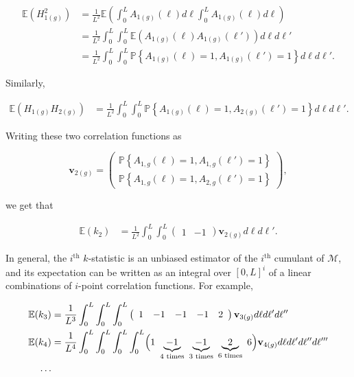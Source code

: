 \documentclass[11pt]{amsart}
\begin{document}
\begin{align*}
	\mathbb{E}(H_{1(g)}^2)
		&=\frac{1}{L^2}\mathbb{E}\left(\int_0^L A_{1(g)}(\ell) d\ell \int_0^L A_{1(g)}(\ell) d\ell\right)\\
		&=\frac{1}{L^2}\int_0^L\int_0^L\mathbb{E}\left(A_{1(g)}(\ell) A_{1(g)}(\ell')\right) d\ell d\ell'\\
		&=\frac{1}{L^2}\int_0^L\int_0^L\mathbb{P}\left\{A_{1(g)}(\ell)=1, A_{1(g)}(\ell')=1\right\} d\ell d\ell'.
\end{align*}

Similarly,

\begin{align*}
	\mathbb{E}(H_{1(g)}H_{2(g)})
		&=\frac{1}{L^2}\int_0^L\int_0^L\mathbb{P}\left\{ A_{1(g)}(\ell)=1, A_{2(g)}(\ell')=1\right\} d\ell d\ell'.
\end{align*}

Writing these two correlation functions as 

$$\mathbf{v}_{2(g)}=\left( \begin{array}{r}
			\mathbb{P}\left\{A_{1,g}(\ell)=1, A_{1,g}(\ell')=1\right\} \\ \mathbb{P}\left\{A_{1,g}(\ell)=1, A_{2,g}(\ell')=1\right\}
		\end{array} \right),$$

we get that

\begin{align}
	\mathbb{E}(k_2)&=\frac{1}{L^2}\int_0^L\int_0^L\left( \begin{array}{cc}
			1 & -1	\end{array} \right)\mathbf{v}_{2(g)} d\ell d\ell'.
	\label{k2}
\end{align}

In general, the $i^\text{th}$ $k$-statistic is an unbiased estimator of the $i^\text{th}$ cumulant of $\mathcal{M}$, and its expectation can be written as an integral over $[0,L]^i $ of a linear combinations of $i$-point correlation functions.
For example, 

\begin{align*}
	\mathbb{E}(k_3)&=\frac{1}{L^3}\int_0^L\int_0^L\int_0^L\left( \begin{array}{ccccc}
			1 & -1 &-1 &-1 &2	\end{array} \right)\mathbf{v}_{3(g)} d\ell d\ell'd\ell''\\
	\mathbb{E}(k_4)&=\frac{1}{L^4}\int_0^L\int_0^L\int_0^L\int_0^L \Bigl(
			1 \  \underbrace{-1}_\text{4 times} \  \underbrace{-1}_\text{3 times} \  \underbrace{2}_\text{6 times} \ 6 \Bigr)\mathbf{v}_{4(g)} d\ell d\ell'd\ell''d\ell'''\\
			\dots
\end{align*}
\end{document}

